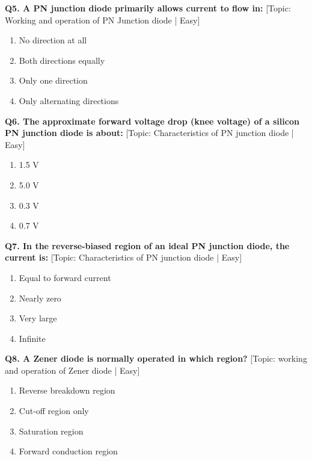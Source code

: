 \noindent\textbf{Q5. A PN junction diode primarily allows current to flow in:} \hfill [Topic: Working and operation of PN Junction diode | Easy]
\begin{enumerate}[label=(\alph*),topsep=2pt,itemsep=1pt,partopsep=0pt,parsep=0pt]
    \item {No direction at all}
    \item {Both directions equally}
    \item {Only one direction}
    \item {Only alternating directions}
\end{enumerate}
\vspace{2mm}

\noindent\textbf{Q6. The approximate forward voltage drop (knee voltage) of a silicon PN junction diode is about:} \hfill [Topic: Characteristics of PN junction diode | Easy]
\begin{enumerate}[label=(\alph*),topsep=2pt,itemsep=1pt,partopsep=0pt,parsep=0pt]
    \item {1.5 V}
    \item {5.0 V}
    \item {0.3 V}
    \item {0.7 V}
\end{enumerate}
\vspace{2mm}

\noindent\textbf{Q7. In the reverse-biased region of an ideal PN junction diode, the current is:} \hfill [Topic: Characteristics of PN junction diode | Easy]
\begin{enumerate}[label=(\alph*),topsep=2pt,itemsep=1pt,partopsep=0pt,parsep=0pt]
    \item {Equal to forward current}
    \item {Nearly zero}
    \item {Very large}
    \item {Infinite}
\end{enumerate}
\vspace{2mm}

\noindent\textbf{Q8. A Zener diode is normally operated in which region?} \hfill [Topic: working and operation of Zener diode | Easy]
\begin{enumerate}[label=(\alph*),topsep=2pt,itemsep=1pt,partopsep=0pt,parsep=0pt]
    \item {Reverse breakdown region}
    \item {Cut-off region only}
    \item {Saturation region}
    \item {Forward conduction region}
\end{enumerate}
\vspace{2mm}

